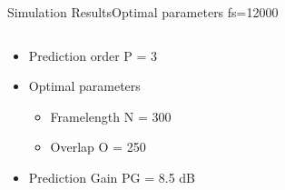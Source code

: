 \begin{frame}{Simulation Results}{Optimal parameters fs=12000}		
	\begin{columns}
		\begin{column}{0.4\textwidth}
			\begin{itemize}
				\item Prediction order P = 3
				\item Optimal parameters
				\begin{itemize}
					\item Framelength N = 300
					\item Overlap O = 250
				\end{itemize}
				\item Prediction Gain PG = 8.5 dB
			\end{itemize}
		\end{column}
		\begin{column}{0.6\textwidth} 
			\resizebox{0.9\columnwidth}{!}{		
				}
		\end{column}
	\end{columns}
\end{frame}


